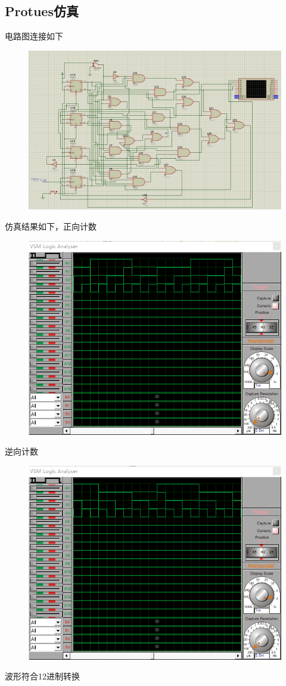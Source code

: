 \documentclass[11pt,UTF8]{ctexart}
\begin{document}
\subsection{Protues仿真}
\par 电路图连接如下
\begin{figure}[H]
    \centering
    \includegraphics[width=0.8\linewidth]{fig/12system_protues_2.PNG}
\end{figure}
\par 仿真结果如下，正向计数
\begin{figure}[H]
    \centering
    \includegraphics[width=0.6\linewidth]{fig/12system_protues_21.PNG}
\end{figure}
\par 逆向计数
\begin{figure}[H]
    \centering
    \includegraphics[width=0.6\linewidth]{fig/12system_protues_22.PNG}
\end{figure}
\par 波形符合12进制转换
\end{document}
